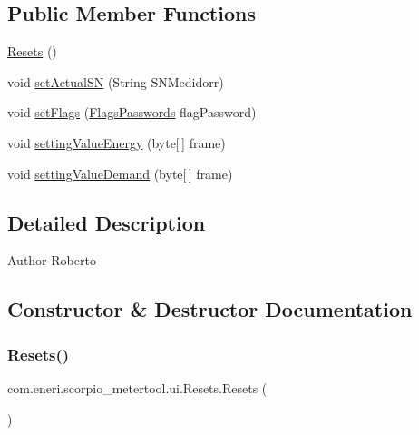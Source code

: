 \subsection*{Public Member Functions}
\begin{DoxyCompactItemize}
\item 
\hyperlink{classcom_1_1eneri_1_1scorpio__metertool_1_1ui_1_1_resets_a16c29cb1e10fba2cedf20f06153189d3}{Resets} ()
\item 
void \hyperlink{classcom_1_1eneri_1_1scorpio__metertool_1_1ui_1_1_resets_ae949fe00832af9fcc9ca7327f0ed57fe}{set\+Actual\+SN} (String S\+N\+Medidorr)
\item 
void \hyperlink{classcom_1_1eneri_1_1scorpio__metertool_1_1ui_1_1_resets_a40ce64dbd9f8cb47c98cf18551601173}{set\+Flags} (\hyperlink{enumcom_1_1eneri_1_1scorpio__metertool_1_1hardwarelayer_1_1_flags_passwords}{Flags\+Passwords} flag\+Password)
\item 
void \hyperlink{classcom_1_1eneri_1_1scorpio__metertool_1_1ui_1_1_resets_a28ace340076aba758af4936b2c7bd3cb}{setting\+Value\+Energy} (byte\mbox{[}$\,$\mbox{]} frame)
\item 
void \hyperlink{classcom_1_1eneri_1_1scorpio__metertool_1_1ui_1_1_resets_af0c07ccac34e6506589f4827329fe193}{setting\+Value\+Demand} (byte\mbox{[}$\,$\mbox{]} frame)
\end{DoxyCompactItemize}


\subsection{Detailed Description}
\begin{DoxyAuthor}{Author}
Roberto 
\end{DoxyAuthor}


\subsection{Constructor \& Destructor Documentation}
\mbox{\label{classcom_1_1eneri_1_1scorpio__metertool_1_1ui_1_1_resets_a16c29cb1e10fba2cedf20f06153189d3}} 
\subsubsection{\texorpdfstring{Resets()}{Resets()}}
{\footnotesize\ttfamily com.\+eneri.\+scorpio\+\_\+metertool.\+ui.\+Resets.\+Resets (\begin{DoxyParamCaption}{ }\end{DoxyParamCaption})}




